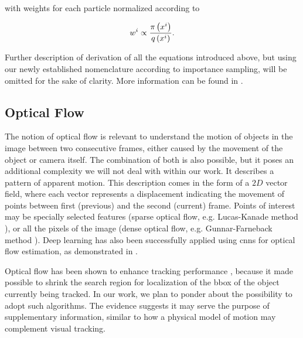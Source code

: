 \noindent with weights for each particle normalized according to

\begin{equation}
    w^i \propto \frac{{\pi} \left( x^i \right)}{{q} \left( x^i \right)}.
\end{equation}

Further description of derivation of all the equations introduced above, but using our newly established nomenclature according to importance sampling, will be omitted for the sake of clarity. More information can be found in \cite{Arulampalam2007}.

\subsection{Optical Flow}
\label{ssec:OpticalFlow}

The notion of optical flow is relevant to understand the motion of objects in the image between two consecutive frames, either caused by the movement of the object or camera itself. The combination of both is also possible, but it poses an additional complexity we will not deal with within our work. It describes a pattern of apparent motion. This description comes in the form of a $2D$ vector field, where each vector represents a displacement indicating the movement of points between first (previous) and the second (current) frame. Points of interest may be specially selected features (sparse optical flow, e.g. Lucas-Kanade method \cite{Lucas1981}), or all the pixels of the image (dense optical flow, e.g. Gunnar-Farneback method \cite{GunnarFarneback}). Deep learning has also been successfully applied using \glspl{cnn} for optical flow estimation, as demonstrated in \cite{Dosovitskiy2015}.

Optical flow has been shown to enhance tracking performance \cite{Leal-Taixe2016}, because it made possible to shrink the search region for localization of the \gls{bbox} of the object currently being tracked. In our work, we plan to ponder about the possibility to adopt such algorithms. The evidence suggests it may serve the purpose of supplementary information, similar to how a physical model of motion may complement visual tracking.

